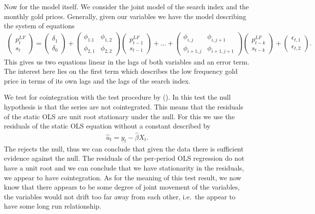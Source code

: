\documentclass[a4paper]{article}
\theoremstyle{definition}
\begin{document}
Now for the model itself. We consider the joint model of the search index and the monthly gold prices. Generally, given our variables we have the model describing the system of equations
	\begin{align*}
		\begin{pmatrix}
		p_t^{LF} \\ s_t
		\end{pmatrix}
	=
		\begin{pmatrix}
		\delta_1 \\ \delta_0
		\end{pmatrix}	
	+
		\begin{pmatrix}
		\phi_{1.1} & \phi_{1,2} \\ \phi_{2,1} & \phi_{2,2}
		\end{pmatrix}
		\begin{pmatrix}
		p_{t-1}^{LF} \\ s_{t-1}
		\end{pmatrix}
	+ \dots + 
		\begin{pmatrix}
		\phi_{i,j} & \phi_{i,j+1} \\ \phi_{i+1,j} & \phi_{i+1,j+1}
		\end{pmatrix}
		\begin{pmatrix}
		p_{t-k}^{LF} \\ s_{t-k}
		\end{pmatrix}
	+ 
		\begin{pmatrix}
		\epsilon_{t,1} \\ \epsilon_{t,2}
		\end{pmatrix}.											
	\end{align*}
This gives us two equations linear in the lags of both variables and an error term. The interest here lies on the first term which describes the low frequency gold price in terms of its own lags and the lags of the search index.

We test for cointegration with the test procedure by \citeauthor{Phillips.1990} (\citeyear{Phillips.1990}). In this test the null hypothesis is that the series are not cointegrated. This means that the residuals of the static OLS are unit root stationary under the null. For this we use the residuals of the static OLS equation without a constant described by
	\begin{align*}
	\hat u_t = y_t - \hat\beta X_t.
	\end{align*}
The \citeauthor{Phillips.1990}	rejects the null, thus we can conclude that given the data there is sufficient evidence against the null. The residuals of the per-period OLS regression do not have a unit root and we can conclude that we have stationarity in the residuals, we appear to have cointegration. As for the meaning of this test result, we now know that there appears to be some degree of joint movement of the variables, the variables would not drift too far away from each other, i.e.\ the appear to have some long run relationship.
\end{document}
